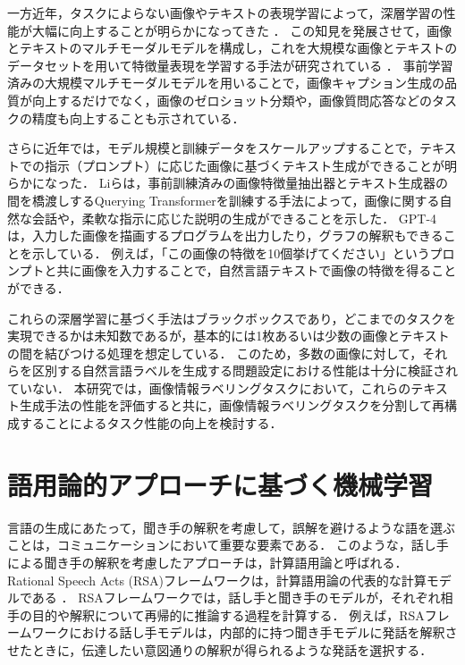 \documentclass[a4paper,11pt]{jreport}
\begin{document}
一方近年，タスクによらない画像やテキストの表現学習によって，深層学習の性能が大幅に向上することが明らかになってきた \cite{Devlin2019}．
この知見を発展させて，画像とテキストのマルチモーダルモデルを構成し，これを大規模な画像とテキストのデータセットを用いて特徴量表現を学習する手法が研究されている \cite{Yin2023,Gan2022}．
事前学習済みの大規模マルチモーダルモデルを用いることで，画像キャプション生成の品質が向上する\cite{Dai2023}だけでなく，画像のゼロショット分類\cite{Radford2021}や，画像質問応答\cite{Song2022}などのタスクの精度も向上することも示されている．

さらに近年では，モデル規模と訓練データをスケールアップすることで，テキストでの指示（プロンプト）に応じた画像に基づくテキスト生成ができることが明らかになった．
Liら\cite{Li2023}は，事前訓練済みの画像特徴量抽出器とテキスト生成器の間を橋渡しするQuerying Transformerを訓練する手法によって，画像に関する自然な会話や，柔軟な指示に応じた説明の生成ができることを示した．
GPT-4\cite{Bubeck2023}は，入力した画像を描画するプログラムを出力したり，グラフの解釈もできることを示している．
例えば，「この画像の特徴を10個挙げてください」というプロンプトと共に画像を入力することで，自然言語テキストで画像の特徴を得ることができる．

これらの深層学習に基づく手法はブラックボックスであり，どこまでのタスクを実現できるかは未知数であるが，基本的には1枚あるいは少数の画像とテキストの間を結びつける処理を想定している．
このため，多数の画像に対して，それらを区別する自然言語ラベルを生成する問題設定における性能は十分に検証されていない．
本研究では，画像情報ラベリングタスクにおいて，これらのテキスト生成手法の性能を評価すると共に，画像情報ラベリングタスクを分割して再構成することによるタスク性能の向上を検討する．

\section{語用論的アプローチに基づく機械学習}
\label{sec:relwork_pragmatic_ml}
言語の生成にあたって，聞き手の解釈を考慮して，誤解を避けるような語を選ぶことは，コミュニケーションにおいて重要な要素である．
このような，話し手による聞き手の解釈を考慮したアプローチは，計算語用論と呼ばれる\cite{Fried2023}．
Rational Speech Acts (RSA)フレームワークは，計算語用論の代表的な計算モデルである \cite{Frank2012,Goodman2016}．
RSAフレームワークでは，話し手と聞き手のモデルが，それぞれ相手の目的や解釈について再帰的に推論する過程を計算する．
例えば，RSAフレームワークにおける話し手モデルは，内部的に持つ聞き手モデルに発話を解釈させたときに，伝達したい意図通りの解釈が得られるような発話を選択する．
\end{document}

